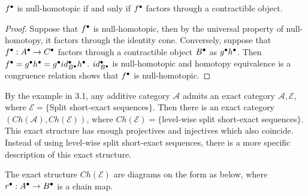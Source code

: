     \begin{lemma}
        $f^{\bullet}$ is null-homotopic if and only if $f^{\bullet}$ factors through a contractible object.
    \end{lemma}

    \begin{proof}
        Suppose that $f^{\bullet}$ is null-homotopic, then by the universal property of null-homotopy, it factors through the identity cone.
        Conversely, suppose that $f^{\bullet}:A^{\bullet}\rightarrow C^{\bullet}$ factors through a contractible object $B^{\bullet}$ as $g^{\bullet}h^{\bullet}$. Then $f^{\bullet}=g^{\bullet}h^{\bullet}=g^{\bullet}id_{B^{\bullet}}^{\bullet}h^{\bullet}$. $id_{B^{\bullet}}^{\bullet}$ is null-homotopic and homotopy equivalence is a congruence relation shows that $f^{\bullet}$ is null-homotopic.
    \end{proof}

    By the example in 3.1, any additive category $\mathcal{A}$ admits an exact category $\mathcal{A},\mathcal{E}$, where $\mathcal{E}=\{$Split short-exact sequences$\}$. Then there is an exact category $(Ch(\mathcal{A}),Ch(\mathcal{E}))$, where $Ch(\mathcal{E})=\{$level-wise split short-exact sequences$\}$. This exact structure has enough projectives and injectives which also coincide. Instead of using level-wise split short-exact sequences, there is a more specific description of this exact structure.

    \begin{prop}
        The exact structure $Ch(\mathcal{E})$ are diagrams on the form as below, where $r^{\bullet}:A^{\bullet}\rightarrow B^{\bullet}$ is a chain map.
        \begin{center}
        \end{center}
    \end{prop}

